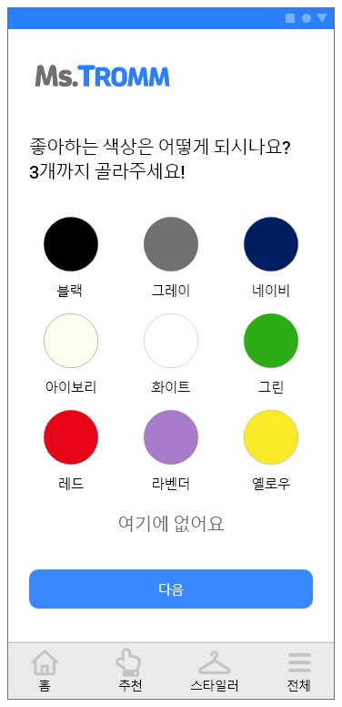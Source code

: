 \documentclass[conference]{IEEEtran}
\begin{document}
\begin{enumerate}
\begin{enumerate}
{                   \includegraphics[scale=0.15]{설문지4.jpg}
}
\end{enumerate}
\end{enumerate}
\end{document}
